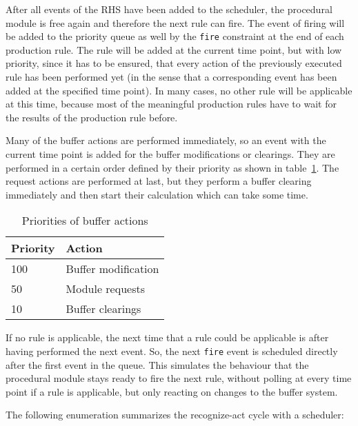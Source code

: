 After all events of the RHS have been added to the scheduler, the procedural module is free again and therefore the next rule can fire. The event of firing will be added to the priority queue as well by the \lstinline|fire| constraint at the end of each production rule. The rule will be added at the current time point, but with low priority, since it has to be ensured, that every action of the previously executed rule has been performed yet (in the sense that a corresponding event has been added at the specified time point). In many cases, no other rule will be applicable at this time, because most of the meaningful production rules have to wait for the results of the production rule before. 

Many of the buffer actions are performed immediately, so an event with the current time point is added for the buffer modifications or clearings. They are performed in a certain order defined by their priority as shown in table~\ref{tab:action_priorities}. The request actions are performed at last, but they perform a buffer clearing immediately and then start their calculation which can take some time. 

\begin{table}[htb]
\begin{center}
\caption{Priorities of buffer actions}
\label{tab:action_priorities}
\begin{tabular}{|l|l|}
\hline
Priority & Action\\
\hline
100 & Buffer modification\\
50 & Module requests\\
10 & Buffer clearings\\
\hline
\end{tabular}
\end{center}
\end{table}


If no rule is applicable, the next time that a rule could be applicable is after having performed the next event. So, the next \lstinline|fire| event is scheduled directly after the first event in the queue. This simulates the behaviour that the procedural module stays ready to fire the next rule, without polling at every time point if a rule is applicable, but only reacting on changes to the buffer system. 

The following enumeration summarizes the recognize-act cycle with a scheduler:

